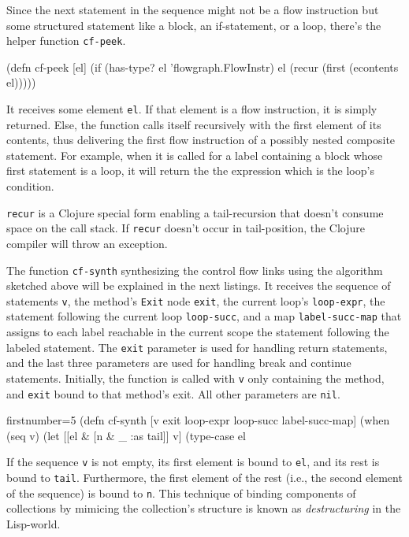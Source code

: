 \documentclass[11pt]{article}
\begin{document}
Since the next statement in the sequence might not be a flow instruction but
some structured statement like a block, an if-statement, or a loop, there's the
helper function \verb|cf-peek|.

\begin{clojurecode}
(defn cf-peek [el]
  (if (has-type? el 'flowgraph.FlowInstr)
    el
    (recur (first (econtents el)))))
\end{clojurecode}

It receives some element \verb|el|.  If that element is a flow instruction, it
is simply returned.  Else, the function calls itself recursively with the first
element of its contents, thus delivering the first flow instruction of a
possibly nested composite statement.  For example, when it is called for a
label containing a block whose first statement is a loop, it will return the
the expression which is the loop's condition.

\verb|recur| is a Clojure special form enabling a tail-recursion that doesn't
consume space on the call stack.  If \verb|recur| doesn't occur in
tail-position, the Clojure compiler will throw an exception.

The function \verb|cf-synth| synthesizing the control flow links using the
algorithm sketched above will be explained in the next listings.  It receives
the sequence of statements \verb|v|, the method's \verb|Exit| node \verb|exit|,
the current loop's \verb|loop-expr|, the statement following the current loop
\verb|loop-succ|, and a map \verb|label-succ-map| that assigns to each label
reachable in the current scope the statement following the labeled statement.
The \verb|exit| parameter is used for handling return statements, and the last
three parameters are used for handling break and continue statements.
Initially, the function is called with \verb|v| only containing the method, and
\verb|exit| bound to that method's exit.  All other parameters are \verb|nil|.

\begin{clojurecode*}{firstnumber=5}
(defn cf-synth [v exit loop-expr loop-succ label-succ-map]
  (when (seq v)
    (let [[el & [n & _ :as tail]] v]
      (type-case el
\end{clojurecode*}

If the sequence \verb|v| is not empty, its first element is bound to \verb|el|,
and its rest is bound to \verb|tail|.  Furthermore, the first element of the
rest (i.e., the second element of the sequence) is bound to \verb|n|.  This
technique of binding components of collections by mimicing the collection's
structure is known as \emph{destructuring} in the Lisp-world.
\end{document}
